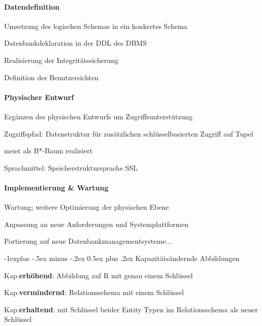 \documentclass[a4paper]{article}
\makeatletter
\renewcommand{\subsection}{\@startsection{subsection}{2}{0mm}%
                                {-1explus -.5ex minus -.2ex}%
                                {0.5ex plus .2ex}%
                                {\normalfont\normalsize\bfseries}}
\makeatother
\begin{document}
\begin{multicols}{3}
    \paragraph{Datendefinition}
    \begin{itemize*}
        \item Umsetzung des logischen Schemas in ein konkretes Schema
        \begin{itemize*}
            \item Datenbankdeklaration in der DDL des DBMS
            \item Realisierung der Integritätssicherung
            \item Definition der Benutzersichten
        \end{itemize*}
    \end{itemize*}

    \paragraph{Physischer Entwurf}
    \begin{itemize*}
        \item Ergänzen des physischen Entwurfs um Zugriffsunterstützung
        \begin{itemize*}
            \item Zugriffspfad: Datenstruktur für zusätzlichen schlüsselbasierten Zugriff auf Tupel
            \item meist als B*-Baum realisiert
        \end{itemize*}
        \item Sprachmittel: Speicherstruktursprache SSL
    \end{itemize*}

    \paragraph{Implementierung \& Wartung}
    \begin{itemize*}
        \item Wartung; weitere Optimierung der physischen Ebene
        \item Anpassung an neue Anforderungen und Systemplattformen
        \item Portierung auf neue Datenbankmanagementsysteme...
    \end{itemize*}

    \subsection{Kapazitätsändernde Abbildungen}
    \begin{itemize*}
        \item Kap.\textbf{erhöhend}: Abbildung auf R mit genau einem Schlüssel
        \item Kap.\textbf{vermindernd}: Relationsschema mit einem Schlüssel
        \item Kap.\textbf{erhaltend}: mit Schlüssel beider Entity Typen im Relationsschema als neuer Schlüssel
    \end{itemize*}


\end{multicols}
\end{document}
